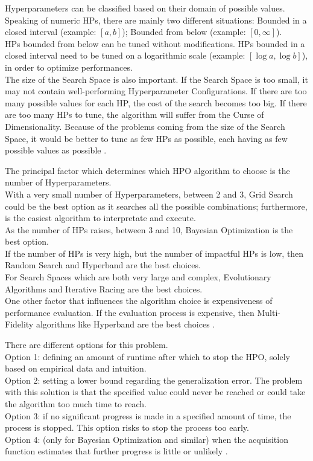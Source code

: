 Hyperparameters can be classified based on their domain of possible values.
Speaking of numeric HPs, there are mainly two different situations: Bounded in a closed interval (example: $[a,b]$); Bounded from below (example: $[0,\infty]$).
\\[0.3cm]HPs bounded from below can be tuned without modifications. HPs bounded in a closed interval need to be tuned on a logarithmic scale (example: $[\log a,\log b]$), in order to optimize performances.
\\[0.3cm]The size of the Search Space is also important. If the Search Space is too small, it may not contain well-performing Hyperparameter Configurations. If there are too many possible values for each HP, the cost of the search becomes too big. If there are too many HPs to tune, the algorithm will suffer from the Curse of Dimensionality.
Because of the problems coming from the size of the Search Space, it would be better to tune as few HPs as possible, each having as few possible values as possible \cite{Tesi-1.8}.

The principal factor which determines which HPO algorithm to choose is the number of Hyperparameters.
\\[0.3cm]With a very small number of Hyperparameters, between 2 and 3, Grid Search could be the best option as it searches all the possible combinations; furthermore, is the easiest algorithm to interpretate and execute.
\\[0.3cm]As the number of HPs raises, between 3 and 10, Bayesian Optimization is the best option.
\\[0.3cm]If the number of HPs is very high, but the number of impactful HPs is low, then Random Search and Hyperband are the best choices.
\\[0.3cm]For Search Spaces which are both very large and complex, Evolutionary Algorithms and Iterative Racing are the best choices.
\\[0.3cm]One other factor that influences the algorithm choice is expensiveness of performance evaluation. If the evaluation process is expensive, then Multi-Fidelity algorithms like Hyperband are the best choices \cite{Tesi-1.8}.

There are different options for this problem.
\\[0.3cm]Option 1: defining an amount of runtime after which to stop the HPO, solely based on empirical data and intuition.
\\[0.3cm]Option 2: setting a lower bound regarding the generalization error. The problem with this solution is that the specified value could never be reached or could take the algorithm too much time to reach.
\\[0.3cm]Option 3: if no significant progress is made in a specified amount of time, the process is stopped. This option risks to stop the process too early.
\\[0.3cm]Option 4: (only for Bayesian Optimization and similar) when the acquisition function estimates that further progress is little or unlikely \cite{Tesi-1.8}.

